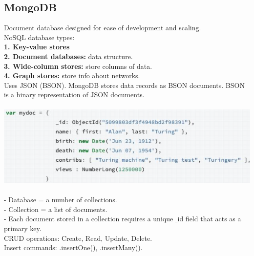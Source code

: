 \documentclass{article}
\begin{document}
\subsection{MongoDB}
Document database designed for ease of development and scaling.\\
NoSQL database types:\\
\textbf{1. Key-value stores}\\
\textbf{2. Document databases:} data structure.\\
\textbf{3. Wide-column stores:} store columns of data.\\
\textbf{4. Graph stores:} store info about networks.\\
Uses JSON (BSON). MongoDB stores data records as BSON documents. BSON is a binary representation of JSON documents.\\\\
\includegraphics[scale=0.5]{19.png}\\\\
- Database = a number of collections.\\
- Collection = a list of documents.\\
- Each document stored in a collection requires a unique $\_$id
field that acts as a primary key.\\
CRUD operations: Create, Read, Update, Delete.\\
Insert commands: .insertOne(), .insertMany().\\
\end{document}
